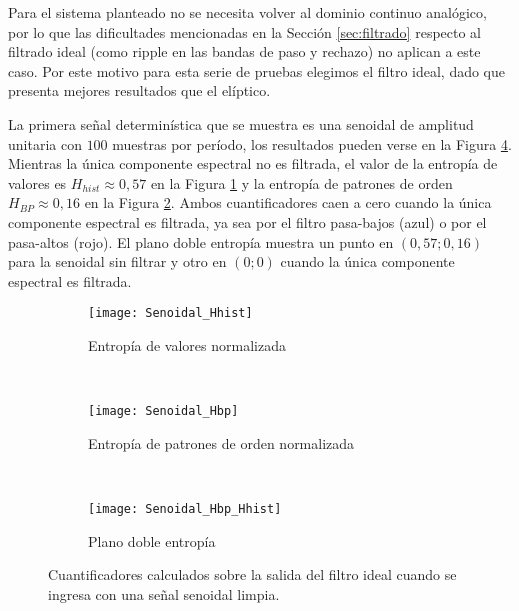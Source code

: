 Para el sistema planteado no se necesita volver al dominio continuo analógico, por lo que las dificultades mencionadas en la Sección \ref{sec:filtrado} respecto al filtrado ideal (como ripple en las bandas de paso y rechazo) no aplican a este caso.
Por este motivo para esta serie de pruebas elegimos el filtro ideal, dado que presenta mejores resultados que el elíptico.

La primera señal determinística que se muestra es una senoidal de amplitud unitaria con $100$ muestras por período, los resultados pueden verse en la Figura \ref{fig:Senoidal}.
Mientras la única componente espectral no es filtrada, el valor de la entropía de valores es $H_{hist}\approx0,57$ en la Figura \ref{subfig:Senoidal_Hhist} y la entropía de patrones de orden $H_{BP}\approx0,16$ en la Figura \ref{subfig:Senoidal_Hbp}.
Ambos cuantificadores caen a cero cuando la única componente espectral es filtrada, ya sea por el filtro pasa-bajos (azul) o por el pasa-altos (rojo).
El plano doble entropía muestra un punto en $\left(0,57;0,16\right)$ para la senoidal sin filtrar y otro en $\left(0;0\right)$ cuando la única componente espectral es filtrada.
%
\begin{figure}[h]
    \centering
    \begin{subfigure}[t]{.49\textwidth}
        \texttt{[image: Senoidal\_Hhist]}
        \caption{Entropía de valores normalizada}
        \label{subfig:Senoidal_Hhist}
    \end{subfigure}
    ~ %
    \begin{subfigure}[t]{.49\textwidth}
        \texttt{[image: Senoidal\_Hbp]}
        \caption{Entropía de patrones de orden normalizada}
        \label{subfig:Senoidal_Hbp}
    \end{subfigure}
    ~ %
    \begin{subfigure}[t]{.49\textwidth}
        \texttt{[image: Senoidal\_Hbp\_Hhist]}
        \caption{Plano doble entropía}
        \label{subfig:Senoidal_HbpHhist}
    \end{subfigure}
    \caption{Cuantificadores calculados sobre la salida del filtro ideal cuando se ingresa con una señal senoidal limpia.}\label{fig:Senoidal}
\end{figure}

